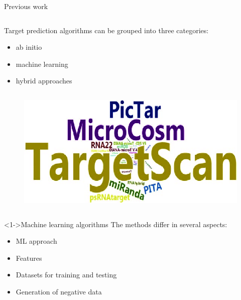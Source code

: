 \documentclass{beamer}
\begin{document}
\begin{frame}{Previous work}
\begin{column}{0.65\textwidth}
Target prediction algorithms can be grouped into three categories:
\begin{itemize}
\item ab initio 
\item machine learning 
\item hybrid approaches
\end{itemize}
\end{column}
\begin{column}{0.35\textwidth}
\begin{figure}[hb!]
	  \centering
    \includegraphics[width=\textwidth]{images/Word-cloud-for-relative-use-of-miRNA-target-prediction-tools-based-on-number-of.png}
\end{figure}
\end{column}
\begin{exampleblock}
		<1->{Machine learning algorithms}
The methods differ in several aspects:	
\begin{itemize}
\item ML approach
\item Features
\item Datasets for training and testing
\item Generation of negative data
\end{itemize}
\end{exampleblock}



\end{frame}
\end{document}
